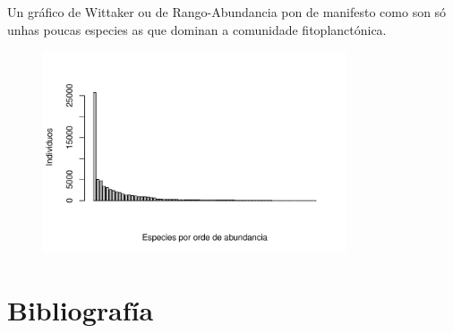 \documentclass{article}
\begin{document}
Un gráfico de Wittaker ou de Rango-Abundancia pon de manifesto como son só unhas poucas especies as que dominan a comunidade fitoplanctónica. 


\begin{figure}[htp]
    \centering
    \includegraphics[width=0.8\textwidth]{margalef53-wittaker}
    \label{fig:sac}
\end{figure}


\section{Bibliografía}

\nocite{*}


\end{document}
